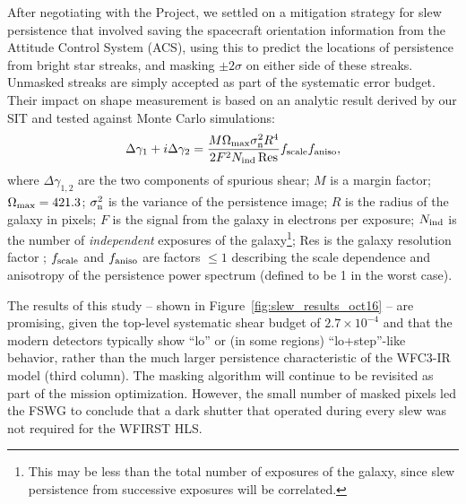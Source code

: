 After negotiating with the Project, we settled on a mitigation strategy for slew persistence that involved saving the spacecraft orientation information from the Attitude Control System (ACS), using this to predict the locations of persistence from bright star streaks, and masking $\pm2\sigma$ on either side of these streaks. Unmasked streaks are simply accepted as part of the systematic error budget. Their impact on shape measurement is based on an analytic result derived by our SIT and tested against Monte Carlo simulations:
\begin{equation}
\Delta \gamma_1 + i\Delta \gamma_2 = \frac{M\Omega_{\rm
max}\sigma_{\rm n}^2 R^4}{2F^2N_{\rm ind}\,{\rm Res}} f_{\rm scale}
f_{\rm aniso},
\label{eq:dg}
\end{equation}
where $\Delta\gamma_{1,2}$ are the two components of spurious shear; $M$ is a margin factor; $\Omega_{\rm max} = 421.3$; $\sigma_{\rm n}^2$ is the variance of the persistence image; $R$ is the radius of the galaxy in pixels; $F$ is the signal from the galaxy in electrons per exposure; $N_{\rm ind}$ is the number of {\em independent} exposures of the galaxy\footnote{This may be less than the total number of exposures of the galaxy, since slew persistence from successive exposures will be correlated.}; Res is the galaxy resolution factor \cite{bej02}; $f_{\rm scale}$ and $f_{\rm aniso}$ are factors $\le 1$ describing the scale dependence and anisotropy of the persistence power spectrum (defined to be 1 in the worst case).

The results of this study -- shown in Figure~\ref{fig:slew_results_oct16} -- are promising, given the top-level systematic shear budget of $2.7\times 10^{-4}$ and that the modern detectors typically show ``lo'' or (in some regions) ``lo+step''-like behavior, rather than the much larger persistence characteristic of the WFC3-IR model (third column). The masking algorithm will continue to be revisited as part of the mission optimization. However, the small number of masked pixels led the FSWG to conclude that a dark shutter that operated during every slew was not required for the WFIRST HLS.

